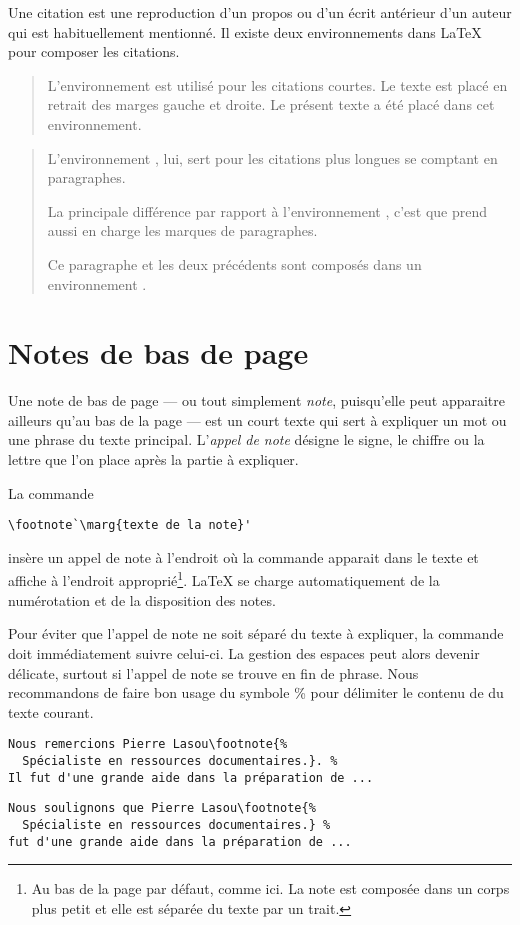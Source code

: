 Une citation est une reproduction d'un propos ou d'un écrit antérieur
d'un auteur qui est habituellement mentionné. Il existe deux
environnements dans {\LaTeX} pour composer les citations.

\begin{quote}
  L'environnement  est utilisé pour les citations courtes.
  Le texte est placé en retrait des marges gauche et droite. Le
  présent texte a été placé dans cet environnement.
\end{quote}

\begin{quotation}
  L'environnement , lui, sert pour les citations plus
  longues se comptant en paragraphes.

  La principale différence par rapport à l'environnement ,
  c'est que  prend aussi en charge les marques de
  paragraphes.

  Ce paragraphe et les deux précédents sont composés dans
  un environnement .
\end{quotation}


\section{Notes de bas de page}
\label{sec:apparence:notes}

Une note de bas de page --- ou tout simplement \emph{note},
puisqu'elle peut apparaitre ailleurs qu'au bas de la page --- est un
court texte qui sert à expliquer un mot ou une phrase du texte
principal. L'\emph{appel de note} désigne le signe, le chiffre ou la
lettre que l'on place après la partie à expliquer.

La commande
\begin{lstlisting}
\footnote`\marg{texte de la note}'
\end{lstlisting}
insère un appel de note à l'endroit où la commande apparait dans le
texte et affiche  à l'endroit
approprié\footnote{%
  Au bas de la page par défaut, comme ici. La note est composée dans
  un corps plus petit et elle est séparée du texte par un trait.}. %
{\LaTeX} se charge automatiquement de la numérotation et de la
disposition des notes.

Pour éviter que l'appel de note ne soit séparé du texte à expliquer,
la commande \cmd{\footnote} doit immédiatement suivre celui-ci. La
gestion des espaces peut alors devenir délicate, surtout si l'appel de
note se trouve en fin de phrase. Nous recommandons de faire bon usage
du symbole \% pour délimiter le contenu de \cmdprint{\footnote} du
texte courant.
\begin{lstlisting}[emph=footnote]
%% note en fin de phrase
Nous remercions Pierre Lasou\footnote{%
  Spécialiste en ressources documentaires.}. %
Il fut d'une grande aide dans la préparation de ...
\end{lstlisting}
\begin{lstlisting}[emph=footnote]
%% note au fil de la phrase
Nous soulignons que Pierre Lasou\footnote{%
  Spécialiste en ressources documentaires.} %
fut d'une grande aide dans la préparation de ...
\end{lstlisting}

